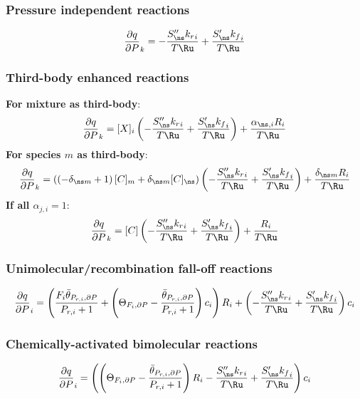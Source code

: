 \documentclass[a4paper,10pt]{article}
\begin{document}
\subsubsection{Pressure independent reactions}
\begin{dmath} \frac{\partial q }{\partial P }_{k} = - \frac{S^{\prime\prime}_{\ns} {k_r}_{i}}{T \Ru} + \frac{S^{\prime}_{\ns} {k_f}_{i}}{T \Ru}\end{dmath} 
\subsubsection{Third-body enhanced reactions}
\textbf{For mixture as third-body}:
\begin{dmath} \frac{\partial q }{\partial P }_{k} = [X]_{i} \left(- \frac{S^{\prime\prime}_{\ns} {k_r}_{i}}{T \Ru} + \frac{S^{\prime}_{\ns} {k_f}_{i}}{T \Ru}\right) + \frac{\alpha_{\ns,i} R_{i}}{T \Ru}\end{dmath} 
\textbf{For species $m$ as third-body}:
\begin{dmath} \frac{\partial q }{\partial P }_{k} = \left(\left(- \delta_{\ns m} + 1\right) [C]_{m} + \delta_{\ns m} [C]_{\ns}\right) \left(- \frac{S^{\prime\prime}_{\ns} {k_r}_{i}}{T \Ru} + \frac{S^{\prime}_{\ns} {k_f}_{i}}{T \Ru}\right) + \frac{\delta_{\ns m} R_{i}}{T \Ru}\end{dmath} 
\textbf{If all $\alpha_{j,i} = 1$}:
\begin{dmath} \frac{\partial q }{\partial P }_{k} = [C] \left(- \frac{S^{\prime\prime}_{\ns} {k_r}_{i}}{T \Ru} + \frac{S^{\prime}_{\ns} {k_f}_{i}}{T \Ru}\right) + \frac{R_{i}}{T \Ru}\end{dmath} 
\subsubsection{Unimolecular/recombination fall-off reactions}
\begin{dmath} \frac{\partial q }{\partial P }_{i} = \left(\frac{F_{i} \bar{\theta}_{P_{r, i}, \partial P}}{P_{r, i} + 1} + \left(\Theta_{F_i, \partial P} - \frac{\bar{\theta}_{P_{r, i}, \partial P}}{P_{r, i} + 1}\right) c_{i}\right) R_{i} + \left(- \frac{S^{\prime\prime}_{\ns} {k_r}_{i}}{T \Ru} + \frac{S^{\prime}_{\ns} {k_f}_{i}}{T \Ru}\right) c_{i}\end{dmath} 
\subsubsection{Chemically-activated bimolecular reactions}
\begin{dmath} \frac{\partial q }{\partial P }_{i} = \left(\left(\Theta_{F_i, \partial P} - \frac{\bar{\theta}_{P_{r, i}, \partial P}}{P_{r, i} + 1}\right) R_{i} - \frac{S^{\prime\prime}_{\ns} {k_r}_{i}}{T \Ru} + \frac{S^{\prime}_{\ns} {k_f}_{i}}{T \Ru}\right) c_{i}\end{dmath} 
\end{document}
